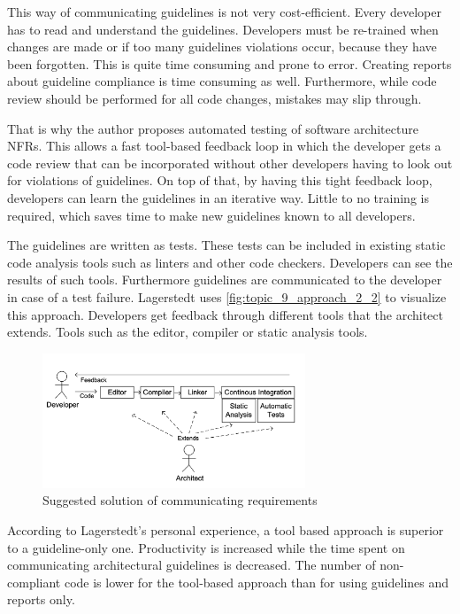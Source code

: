 This way of communicating guidelines is not very cost-efficient.
Every developer has to read and understand the guidelines. Developers must be re-trained when changes are made or if too many guidelines violations occur, because they have been forgotten.
This is quite time consuming and prone to error.  Creating reports about guideline compliance is time consuming as well.
Furthermore, while code review should be performed for all code changes, mistakes may slip through.

That is why the author proposes automated testing of software architecture NFRs.
This allows a fast tool-based feedback loop in which the developer gets a code review that can be incorporated without other developers having to look out for violations of guidelines.
On top of that, by having this tight feedback loop, developers can learn the guidelines in an iterative way.
Little to no training is required, which saves time to make new guidelines known to all developers.

The guidelines are written as tests. These tests can be included in existing static code analysis tools such as linters and other code checkers. Developers can see the results of such tools.
Furthermore guidelines are communicated to the developer in case of a test failure.
Lagerstedt uses \autoref{fig:topic_9_approach_2_2} to visualize this approach.
Developers get feedback through different tools that the architect extends. Tools such as the editor, compiler or static analysis tools.

\begin{figure}[htbp]
	\centering
	\includegraphics[width=0.7\textwidth]{../images/topic_9_approach_2_2.png}
	\caption{Suggested solution of communicating requirements~\cite{Lagerstedt2014}}
	\label{fig:topic_9_approach_2_2}
\end{figure}
\newpage
According to Lagerstedt's personal experience, a tool based approach is superior to a guideline-only one.
Productivity is increased while the time spent on communicating architectural guidelines is decreased.
The number of non-compliant code is lower for the tool-based approach than for using guidelines and reports only.



